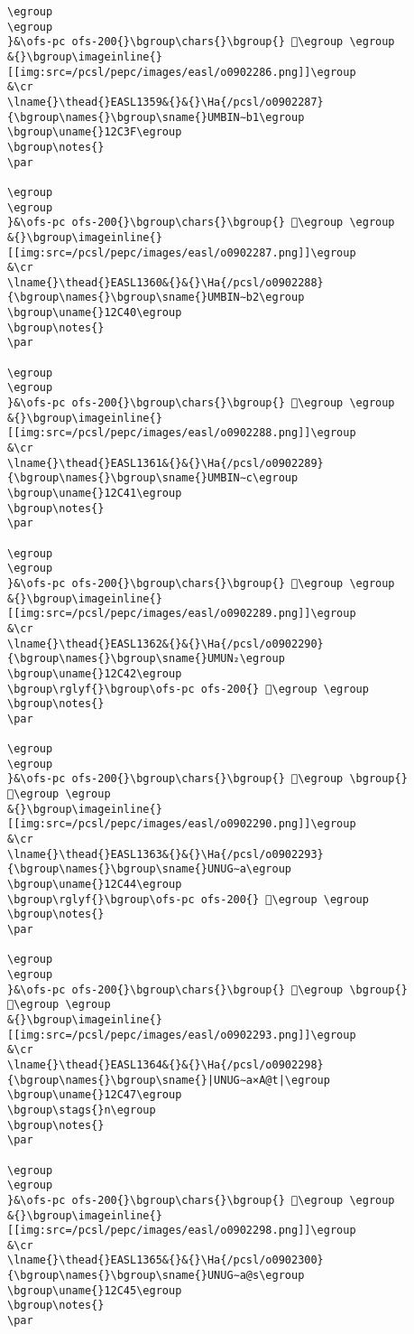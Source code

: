 \begin{verbatim}
\egroup
\egroup
}&\ofs-pc ofs-200{}\bgroup\chars{}\bgroup{} 𒰾\egroup \egroup
&{}\bgroup\imageinline{}[[img:src=/pcsl/pepc/images/easl/o0902286.png]]\egroup
&\cr
\lname{}\thead{}EASL1359&{}&{}\Ha{/pcsl/o0902287}{\bgroup\names{}\bgroup\sname{}UMBIN∼b1\egroup
\bgroup\uname{}12C3F\egroup
\bgroup\notes{}
\par 

\egroup
\egroup
}&\ofs-pc ofs-200{}\bgroup\chars{}\bgroup{} 𒰿\egroup \egroup
&{}\bgroup\imageinline{}[[img:src=/pcsl/pepc/images/easl/o0902287.png]]\egroup
&\cr
\lname{}\thead{}EASL1360&{}&{}\Ha{/pcsl/o0902288}{\bgroup\names{}\bgroup\sname{}UMBIN∼b2\egroup
\bgroup\uname{}12C40\egroup
\bgroup\notes{}
\par 

\egroup
\egroup
}&\ofs-pc ofs-200{}\bgroup\chars{}\bgroup{} 𒱀\egroup \egroup
&{}\bgroup\imageinline{}[[img:src=/pcsl/pepc/images/easl/o0902288.png]]\egroup
&\cr
\lname{}\thead{}EASL1361&{}&{}\Ha{/pcsl/o0902289}{\bgroup\names{}\bgroup\sname{}UMBIN∼c\egroup
\bgroup\uname{}12C41\egroup
\bgroup\notes{}
\par 

\egroup
\egroup
}&\ofs-pc ofs-200{}\bgroup\chars{}\bgroup{} 𒱁\egroup \egroup
&{}\bgroup\imageinline{}[[img:src=/pcsl/pepc/images/easl/o0902289.png]]\egroup
&\cr
\lname{}\thead{}EASL1362&{}&{}\Ha{/pcsl/o0902290}{\bgroup\names{}\bgroup\sname{}UMUN₂\egroup
\bgroup\uname{}12C42\egroup
\bgroup\rglyf{}\bgroup\ofs-pc ofs-200{} 𒱂\egroup \egroup
\bgroup\notes{}
\par 

\egroup
\egroup
}&\ofs-pc ofs-200{}\bgroup\chars{}\bgroup{} 𒱃\egroup \bgroup{} 𒱂\egroup \egroup
&{}\bgroup\imageinline{}[[img:src=/pcsl/pepc/images/easl/o0902290.png]]\egroup
&\cr
\lname{}\thead{}EASL1363&{}&{}\Ha{/pcsl/o0902293}{\bgroup\names{}\bgroup\sname{}UNUG∼a\egroup
\bgroup\uname{}12C44\egroup
\bgroup\rglyf{}\bgroup\ofs-pc ofs-200{} 𒱄\egroup \egroup
\bgroup\notes{}
\par 

\egroup
\egroup
}&\ofs-pc ofs-200{}\bgroup\chars{}\bgroup{} 𒱆\egroup \bgroup{} 𒱄\egroup \egroup
&{}\bgroup\imageinline{}[[img:src=/pcsl/pepc/images/easl/o0902293.png]]\egroup
&\cr
\lname{}\thead{}EASL1364&{}&{}\Ha{/pcsl/o0902298}{\bgroup\names{}\bgroup\sname{}|UNUG∼a×A@t|\egroup
\bgroup\uname{}12C47\egroup
\bgroup\stags{}n\egroup
\bgroup\notes{}
\par 

\egroup
\egroup
}&\ofs-pc ofs-200{}\bgroup\chars{}\bgroup{} 𒱇\egroup \egroup
&{}\bgroup\imageinline{}[[img:src=/pcsl/pepc/images/easl/o0902298.png]]\egroup
&\cr
\lname{}\thead{}EASL1365&{}&{}\Ha{/pcsl/o0902300}{\bgroup\names{}\bgroup\sname{}UNUG∼a@s\egroup
\bgroup\uname{}12C45\egroup
\bgroup\notes{}
\par 


\end{verbatim}
